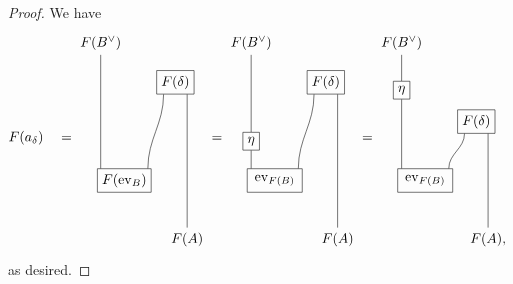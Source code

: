 \documentclass[english]{article}
\numberwithin{equation}{section}
\begin{document}
\begin{proof}
  We have
    \begin{equation*}
    \label{eq:assembly}
    F(a_\delta) \quad =
    \begin{tikzpicture}[baseline=(current bounding box.center)]
      \node (Bvee) at (-0.6,4) {$F(B^\vee)$};
      \node (A) at (1.6,-1) {$F(A)$};

      \node (deltabox) at (1.3,3) [rectangle, draw, minimum width=0.6cm, minimum height=0.6cm] {$F(\delta )$};
      \node (evbox) at (0,0.5) [rectangle, draw, minimum width=0.6cm, minimum height=0.6cm] {$F(\mathrm{ev}_B)$};


      \draw (Bvee) -- (evbox.north -| -0.6,1.3);
      \draw (deltabox.south -| 1,2.5) to [out=270,in=90] (evbox.north -| 0.6,1.3);
      \draw (deltabox.south -| 1.6,2.5) -- (A);
    \end{tikzpicture}
    =
        \begin{tikzpicture}[baseline=(current bounding box.center)]
      \node (Bvee) at (-0.6,4) {$F(B^\vee)$};
      \node (A) at (1.6,-1) {$F(A)$};

      \node (etabox) at (-0.6,1.5) [rectangle, draw, minimum width=0.4cm, minimum height=0.4cm]{$\eta$};
      \node (deltabox) at (1.3,3) [rectangle, draw, minimum width=0.6cm, minimum height=0.6cm] {$F(\delta )$};
      \node (evbox) at (0,0.5) [rectangle, draw, minimum width=1.4cm, minimum height=0.6cm] {$\mathrm{ev}_{F(B)}$};


      \draw (Bvee) -- (etabox.north);
      \draw (etabox.south) -- (evbox.north -| -0.6,1.3);
      \draw (deltabox.south -| 1,2.5) to [out=270,in=90] (evbox.north -| 0.6,1.3);
      \draw (deltabox.south -| 1.6,2.5) -- (A);
    \end{tikzpicture}
        =
        \begin{tikzpicture}[baseline=(current bounding box.center)]
      \node (Bvee) at (-0.6,4) {$F(B^\vee)$};
      \node (A) at (1.6,-1) {$F(A)$,};

      \node (etabox) at (-0.6,2.8) [rectangle, draw, minimum width=0.4cm, minimum height=0.4cm]{$\eta$};
      \node (deltabox) at (1.3,2) [rectangle, draw, minimum width=0.6cm, minimum height=0.6cm] {$F(\delta )$};
      \node (evbox) at (0,0.5) [rectangle, draw, minimum width=1.4cm, minimum height=0.6cm] {$\mathrm{ev}_{F(B)}$};


      \draw (Bvee) -- (etabox.north);
      \draw (etabox.south) -- (evbox.north -| -0.6,1.3);
      \draw (deltabox.south -| 1,2.5) to [out=270,in=90] (evbox.north -| 0.6,1.3);
      \draw (deltabox.south -| 1.6,2.5) -- (A);
  \end{tikzpicture}
\end{equation*}
as desired.
\end{proof}
\end{document}
